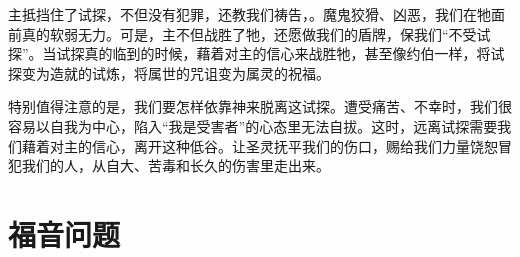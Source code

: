 \begin{paracol}{2}
{  主抵挡住了试探，不但没有犯罪，还教我们祷告，。魔鬼狡猾、凶恶，我们在牠面前真的软弱无力。可是，主不但战胜了牠，还愿做我们的盾牌，保我们“不受试探”。当试探真的临到的时候，藉着对主的信心来战胜牠，甚至像约伯一样，将试探变为造就的试炼，将属世的咒诅变为属灵的祝福。

  特别值得注意的是，我们要怎样依靠神来脱离这试探。遭受痛苦、不幸时，我们很容易以自我为中心，陷入“我是受害者”的心态里无法自拔。这时，远离试探需要我们藉着对主的信心，离开这种低谷。让圣灵抚平我们的伤口，赐给我们力量饶恕冒犯我们的人，从自大、苦毒和长久的伤害里走出来。}
\end{paracol}

\qquad

\section{福音问题}

